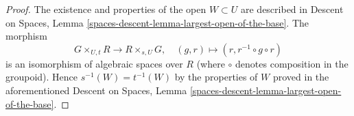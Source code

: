 \documentclass{stacks-project}
\theoremstyle{plain}
\theoremstyle{definition}
\theoremstyle{remark}
\numberwithin{equation}{subsection}
\begin{document}
\begin{proof}
The existence and properties of the open $W \subset U$ are described in
Descent on Spaces, Lemma \ref{spaces-descent-lemma-largest-open-of-the-base}.
The morphism
$$
G \times_{U, t} R \longrightarrow R \times_{s, U} G, \quad
(g, r) \longmapsto (r, r^{-1} \circ g \circ r)
$$
is an isomorphism of algebraic spaces over $R$ (where $\circ$ denotes
composition in the groupoid). Hence $s^{-1}(W) = t^{-1}(W)$ by the
properties of $W$ proved in the aforementioned
Descent on Spaces, Lemma \ref{spaces-descent-lemma-largest-open-of-the-base}.
\end{proof}
\end{document}
